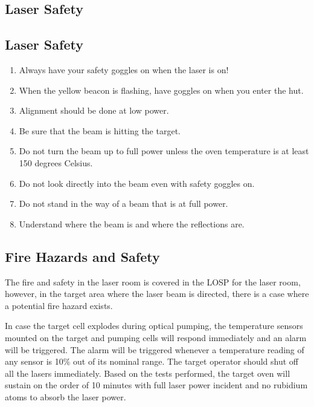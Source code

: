 \begin{safetyen}{10}{5}
\section{Laser Safety}
\label{sec:lsafe}

\subsection{Laser Safety}
\label{sec:lassaf}

\begin{enumerate}
\item Always have your safety goggles on when the laser is on!
\item When the yellow beacon is flashing, have goggles on when you enter
the hut.
\item Alignment should be done at low power.
\item Be sure that the beam is hitting the target.
\item Do not turn the beam up to full power unless the oven temperature
is at least 150 degrees Celsius.
\item Do not look directly into the beam even with safety goggles on.
\item Do not stand in the way of a beam that is at full power.
\item Understand where the beam is and where the reflections are.
\end{enumerate}

\subsection{Fire Hazards and Safety}
\label{sec:targ-polhelfire}

The fire and safety in the laser room is covered in the LOSP
for the laser room,
however, in the target area where the laser beam is directed, there is a
case where a potential 
fire hazard exists. 

In case the target cell explodes during optical pumping, the temperature 
sensors mounted on the target and pumping cells will respond immediately and 
an alarm will be triggered. The alarm will be triggered whenever 
a temperature reading of any sensor is 10$\%$ out of its nominal range.
The target operator should shut off all the lasers immediately.
Based on the tests performed, the target oven will sustain on the order of 10 
minutes with full laser power incident and no rubidium atoms 
to absorb the laser power.



\end{safetyen}
